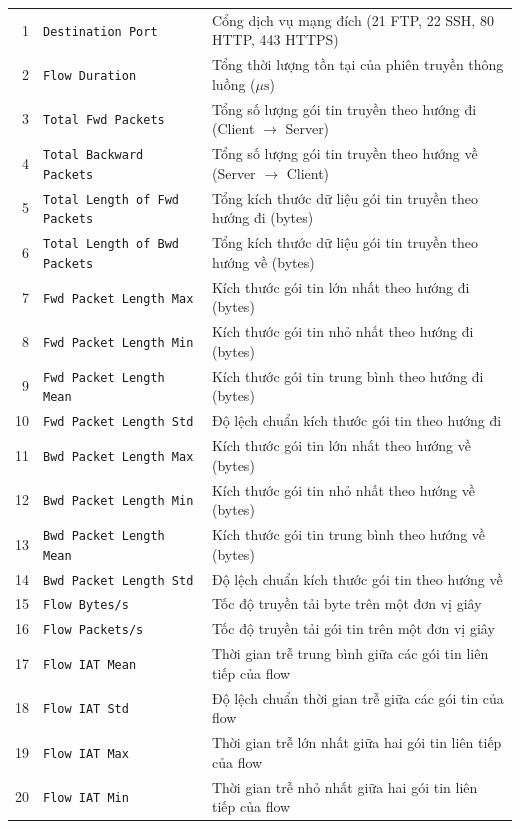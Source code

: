\begin{longtable}{rlp{7.2cm}}
1 & \texttt{Destination Port} & Cổng dịch vụ mạng đích (21 FTP, 22 SSH, 80 HTTP, 443 HTTPS) \\
2 & \texttt{Flow Duration} & Tổng thời lượng tồn tại của phiên truyền thông luồng ($\mu\text{s}$) \\
3 & \texttt{Total Fwd Packets} & Tổng số lượng gói tin truyền theo hướng đi (Client $\to$ Server) \\
4 & \texttt{Total Backward Packets} & Tổng số lượng gói tin truyền theo hướng về (Server $\to$ Client) \\
5 & \texttt{Total Length of Fwd Packets} & Tổng kích thước dữ liệu gói tin truyền theo hướng đi (bytes) \\
6 & \texttt{Total Length of Bwd Packets} & Tổng kích thước dữ liệu gói tin truyền theo hướng về (bytes) \\
7 & \texttt{Fwd Packet Length Max} & Kích thước gói tin lớn nhất theo hướng đi (bytes) \\
8 & \texttt{Fwd Packet Length Min} & Kích thước gói tin nhỏ nhất theo hướng đi (bytes) \\
9 & \texttt{Fwd Packet Length Mean} & Kích thước gói tin trung bình theo hướng đi (bytes) \\
10 & \texttt{Fwd Packet Length Std} & Độ lệch chuẩn kích thước gói tin theo hướng đi \\
11 & \texttt{Bwd Packet Length Max} & Kích thước gói tin lớn nhất theo hướng về (bytes) \\
12 & \texttt{Bwd Packet Length Min} & Kích thước gói tin nhỏ nhất theo hướng về (bytes) \\
13 & \texttt{Bwd Packet Length Mean} & Kích thước gói tin trung bình theo hướng về (bytes) \\
14 & \texttt{Bwd Packet Length Std} & Độ lệch chuẩn kích thước gói tin theo hướng về \\
15 & \texttt{Flow Bytes/s} & Tốc độ truyền tải byte trên một đơn vị giây \\
16 & \texttt{Flow Packets/s} & Tốc độ truyền tải gói tin trên một đơn vị giây \\
17 & \texttt{Flow IAT Mean} & Thời gian trễ trung bình giữa các gói tin liên tiếp của flow \\
18 & \texttt{Flow IAT Std} & Độ lệch chuẩn thời gian trễ giữa các gói tin của flow \\
19 & \texttt{Flow IAT Max} & Thời gian trễ lớn nhất giữa hai gói tin liên tiếp của flow \\
20 & \texttt{Flow IAT Min} & Thời gian trễ nhỏ nhất giữa hai gói tin liên tiếp của flow \\

\end{longtable}
